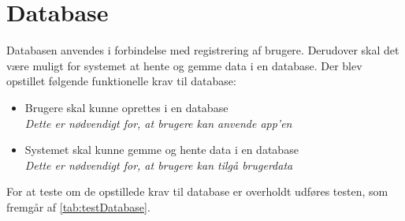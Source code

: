 \section{Database}
Databasen anvendes i forbindelse med registrering af brugere. Derudover skal det være muligt for systemet at hente og gemme data i en database. Der blev opstillet følgende funktionelle krav til database:
 
\begin{itemize}
\item Brugere skal kunne oprettes i en database
\\
\textit{Dette er nødvendigt for, at brugere kan anvende app’en}
\item Systemet skal kunne gemme og hente data i en database
\\
\textit{Dette er nødvendigt for, at brugere kan tilgå brugerdata}
\end{itemize}

\noindent
For at teste om de opstillede krav til database er overholdt udføres testen, som fremgår af \autoref{tab:testDatabase}.

